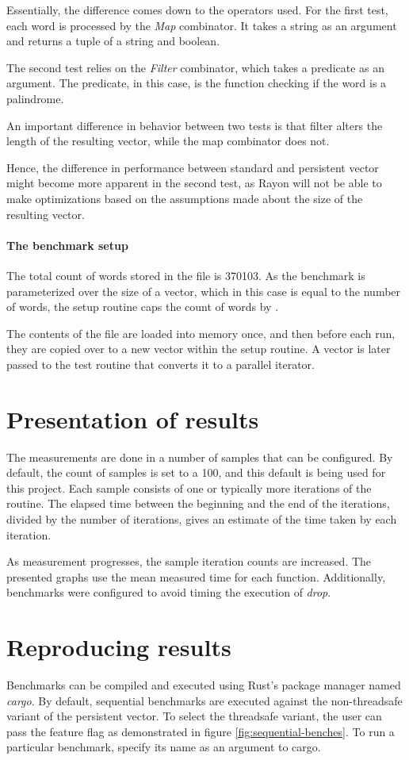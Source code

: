 Essentially, the difference comes down to the operators used. For the first test, each word is processed by the \emph{Map} combinator. It takes a string as an argument and returns a tuple of a string and boolean.

The second test relies on the \emph{Filter} combinator, which takes a predicate as an argument. The predicate, in this case, is the function checking if the word is a palindrome.

An important difference in behavior between two tests is that filter alters the length of the resulting vector, while the map combinator does not.

Hence, the difference in performance between standard and persistent vector might become more apparent in the second test, as Rayon will not be able to make optimizations based on the assumptions made about the size of the resulting vector.

\paragraph*{The benchmark setup}
The total count of words stored in the file is 370103. As the benchmark is parameterized over the size of a vector, which in this case is equal to the number of words, the setup routine caps the count of words by \n{}.

The contents of the file are loaded into memory once, and then before each run, they are copied over to a new vector within the setup routine. A vector is later passed to the test routine that converts it to a parallel iterator.

\section{Presentation of results}
The measurements are done in a number of samples that can be configured. By default, the count of samples is set to a 100, and this default is being used for this project. Each sample consists of one or typically more iterations of the routine. The elapsed time between the beginning and the end of the iterations, divided by the number of iterations, gives an estimate of the time taken by each iteration.

As measurement progresses, the sample iteration counts are increased. The presented graphs use the mean measured time for each function. Additionally, benchmarks were configured to avoid timing the execution of \emph{drop}.

\section{Reproducing results}
Benchmarks can be compiled and executed using Rust's package manager named \emph{cargo}. By default, sequential benchmarks are executed against the non-threadsafe variant of the persistent vector. To select the threadsafe variant, the user can pass the \arc{} feature flag as demonstrated in figure \ref{fig:sequential-benches}. To run a particular benchmark, specify its name as an argument to cargo.

